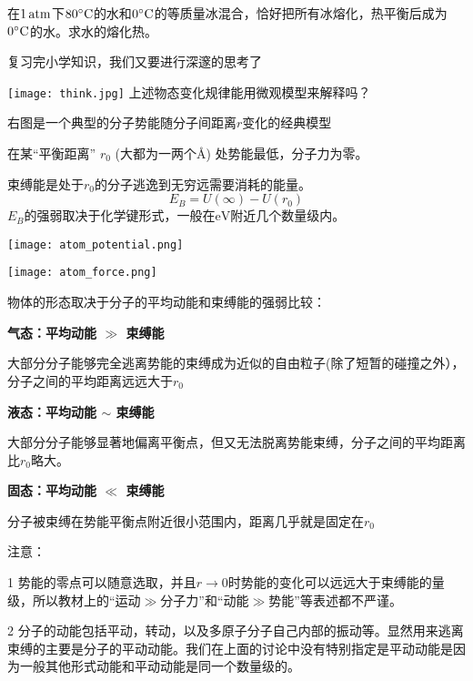\documentclass[CJK]{beamer}
\begin{document}
\begin{frame}
\bch
在$1\,\mathrm{atm}$下$80^\circ \mathrm{C}$的水和$0^\circ \mathrm{C}$的等质量冰混合，恰好把所有冰熔化，热平衡后成为$0^\circ \mathrm{C}$的水。求水的熔化热。
\ech
\end{frame}


\begin{frame}
\bch

复习完小学知识，我们又要进行深邃的思考了

\bcenter
\texttt{[image: think.jpg]}
\ecenter
上述物态变化规律能用微观模型来解释吗？
\ech
\end{frame}

\begin{frame}
\bch

{\small
右图是一个典型的分子势能随分子间距离$r$变化的经典模型

在某“平衡距离” $r_0$ (大都为一两个\AA) 处势能最低，分子力为零。

束缚能是处于$r_0$的分子逃逸到无穷远需要消耗的能量。
$$E_B = U(\infty) - U(r_0) $$
$E_B$的强弱取决于化学键形式，一般在$\mathrm{eV}$附近几个数量级内。}
\emini
\hspace{0.2in}

\texttt{[image: atom\_potential.png]}

\vspace{0.05in}

\texttt{[image: atom\_force.png]}
\emini
\ech
\end{frame}

\begin{frame}
\bch
物体的形态取决于分子的平均动能和束缚能的强弱比较：
\bitem
\item{{\bf 气态：平均动能 $\gg$ 束缚能}

{\scriptsize 大部分分子能够完全逃离势能的束缚成为近似的自由粒子(除了短暂的碰撞之外），分子之间的平均距离远远大于$r_0$}
}
\item{{\bf 液态：平均动能 $\sim$ 束缚能}

{\scriptsize 大部分分子能够显著地偏离平衡点，但又无法脱离势能束缚，分子之间的平均距离比$r_0$略大。}
}
\item{{\bf 固态：平均动能 $\ll$ 束缚能}

{\scriptsize 分子被束缚在势能平衡点附近很小范围内，距离几乎就是固定在$r_0$}
}
\eitem

{\scriptsize 注意：
\bitem
\item[1]{ 势能的零点可以随意选取，并且$r\rightarrow 0$时势能的变化可以远远大于束缚能的量级，所以教材上的“运动$\gg$分子力”和“动能$\gg$势能”等表述都不严谨。}
\item[2]{分子的动能包括平动，转动，以及多原子分子自己内部的振动等。显然用来逃离束缚的主要是分子的平动动能。我们在上面的讨论中没有特别指定是平动动能是因为一般其他形式动能和平动动能是同一个数量级的。}
\eitem
}
\ech
\end{frame}
\end{document}
